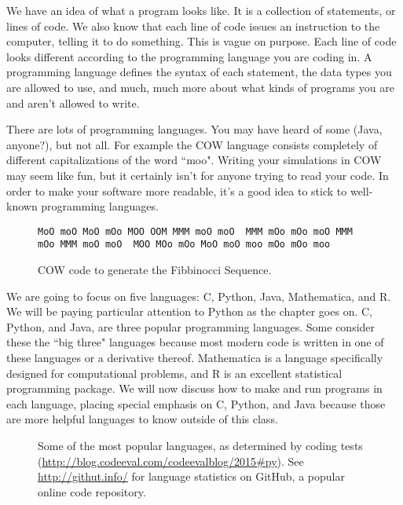 \documentclass[a4paper]{article}
\begin{document}
We have an idea of what a program looks like. It is a collection of statements, or lines of code. We also know that each line of code issues an instruction to the computer, telling it to do something. This is vague on purpose. Each line of code looks different according to the programming language you are coding in. A programming language defines the syntax of each statement, the data types you are allowed to use, and much, much more about what kinds of programs you are and aren't allowed to write.

There are lots of programming languages. You may have heard of some (Java, anyone?), but not all. For example the COW language consists completely of different capitalizations of the word ``moo". Writing your simulations in COW may seem like fun, but it certainly isn't for anyone trying to read your code. In order to make your software more readable, it's a good idea to stick to well-known programming languages.

\begin{figure}
\begin{center}
\scriptsize
\begin{verbatim}
MoO moO MoO mOo MOO OOM MMM moO moO  MMM mOo mOo moO MMM
mOo MMM moO moO  MOO MOo mOo MoO moO moo mOo mOo moo
\end{verbatim}
\normalsize
\caption{\label{fig:cowcode} COW code to generate the Fibbinocci Sequence.}
\end{center}\end{figure}

We are going to focus on five languages: C, Python, Java, Mathematica, and R. We will be paying particular attention to Python as the chapter goes on. C, Python, and Java, are three popular programming languages. Some consider these the ``big three" languages because most modern code is written in one of these languages or a derivative thereof. Mathematica is a language specifically designed for computational problems, and R is an excellent statistical programming package. We will now discuss how to make and run programs in each language, placing special emphasis on C, Python, and Java because those are more helpful languages to know outside of this class.

\begin{figure}
\begin{center}
\caption{\label{fig:languagePopularity} Some of the most popular languages, as determined by coding tests (\url{http://blog.codeeval.com/codeevalblog/2015\#py}). See \url{http://githut.info/} for language statistics on GitHub, a popular online code repository.}
\end{center}\end{figure}
\end{document}
